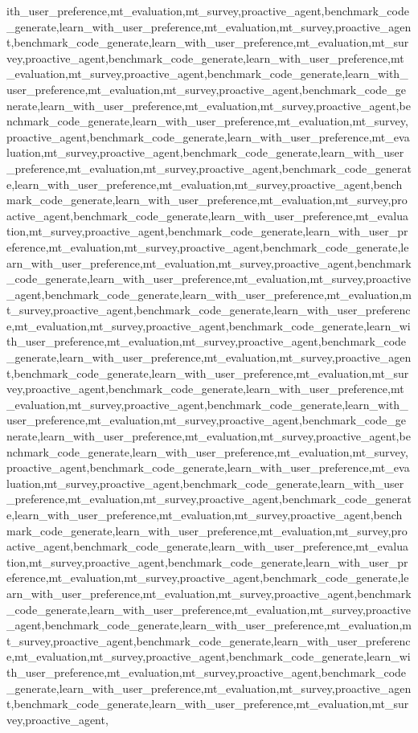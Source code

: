 ith_user_preference,mt_evaluation,mt_survey,proactive_agent,benchmark_code_generate,learn_with_user_preference,mt_evaluation,mt_survey,proactive_agent,benchmark_code_generate,learn_with_user_preference,mt_evaluation,mt_survey,proactive_agent,benchmark_code_generate,learn_with_user_preference,mt_evaluation,mt_survey,proactive_agent,benchmark_code_generate,learn_with_user_preference,mt_evaluation,mt_survey,proactive_agent,benchmark_code_generate,learn_with_user_preference,mt_evaluation,mt_survey,proactive_agent,benchmark_code_generate,learn_with_user_preference,mt_evaluation,mt_survey,proactive_agent,benchmark_code_generate,learn_with_user_preference,mt_evaluation,mt_survey,proactive_agent,benchmark_code_generate,learn_with_user_preference,mt_evaluation,mt_survey,proactive_agent,benchmark_code_generate,learn_with_user_preference,mt_evaluation,mt_survey,proactive_agent,benchmark_code_generate,learn_with_user_preference,mt_evaluation,mt_survey,proactive_agent,benchmark_code_generate,learn_with_user_preference,mt_evaluation,mt_survey,proactive_agent,benchmark_code_generate,learn_with_user_preference,mt_evaluation,mt_survey,proactive_agent,benchmark_code_generate,learn_with_user_preference,mt_evaluation,mt_survey,proactive_agent,benchmark_code_generate,learn_with_user_preference,mt_evaluation,mt_survey,proactive_agent,benchmark_code_generate,learn_with_user_preference,mt_evaluation,mt_survey,proactive_agent,benchmark_code_generate,learn_with_user_preference,mt_evaluation,mt_survey,proactive_agent,benchmark_code_generate,learn_with_user_preference,mt_evaluation,mt_survey,proactive_agent,benchmark_code_generate,learn_with_user_preference,mt_evaluation,mt_survey,proactive_agent,benchmark_code_generate,learn_with_user_preference,mt_evaluation,mt_survey,proactive_agent,benchmark_code_generate,learn_with_user_preference,mt_evaluation,mt_survey,proactive_agent,benchmark_code_generate,learn_with_user_preference,mt_evaluation,mt_survey,proactive_agent,benchmark_code_generate,learn_with_user_preference,mt_evaluation,mt_survey,proactive_agent,benchmark_code_generate,learn_with_user_preference,mt_evaluation,mt_survey,proactive_agent,benchmark_code_generate,learn_with_user_preference,mt_evaluation,mt_survey,proactive_agent,benchmark_code_generate,learn_with_user_preference,mt_evaluation,mt_survey,proactive_agent,benchmark_code_generate,learn_with_user_preference,mt_evaluation,mt_survey,proactive_agent,benchmark_code_generate,learn_with_user_preference,mt_evaluation,mt_survey,proactive_agent,benchmark_code_generate,learn_with_user_preference,mt_evaluation,mt_survey,proactive_agent,benchmark_code_generate,learn_with_user_preference,mt_evaluation,mt_survey,proactive_agent,benchmark_code_generate,learn_with_user_preference,mt_evaluation,mt_survey,proactive_agent,benchmark_code_generate,learn_with_user_preference,mt_evaluation,mt_survey,proactive_agent,benchmark_code_generate,learn_with_user_preference,mt_evaluation,mt_survey,proactive_agent,benchmark_code_generate,learn_with_user_preference,mt_evaluation,mt_survey,proactive_agent,benchmark_code_generate,learn_with_user_preference,mt_evaluation,mt_survey,proactive_agent,benchmark_code_generate,learn_with_user_preference,mt_evaluation,mt_survey,proactive_agent,benchmark_code_generate,learn_with_user_preference,mt_evaluation,mt_survey,proactive_agent,